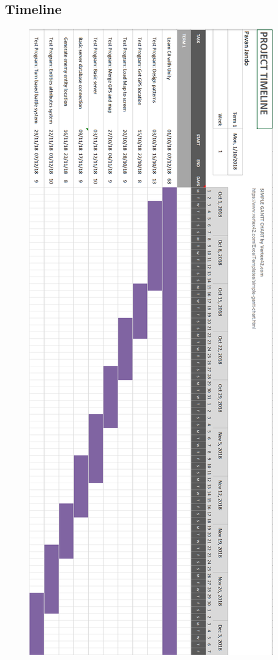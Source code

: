 \documentclass[a4paper]{report}
\begin{document}
\begin{landscape}
\section{Timeline}
\begin{figure}[!h]
	\centering
	\includegraphics[scale=0.80, angle=90,]{term1}

\end{figure}
\end{landscape}
\end{document}
